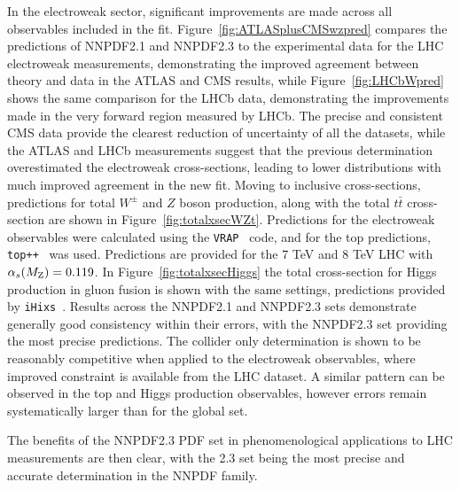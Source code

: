 In the electroweak sector, significant improvements are made across all observables included in the fit. Figure~\ref{fig:ATLASplusCMSwzpred} compares the predictions of NNPDF2.1 and NNPDF2.3 to the experimental data for the LHC electroweak measurements, demonstrating the improved agreement between theory and data in the ATLAS and CMS results, while Figure~\ref{fig:LHCbWpred} shows the same comparison for the LHCb data, demonstrating the improvements made in the very forward region measured by LHCb. The precise and consistent CMS data provide the clearest reduction of uncertainty of all the datasets, while the ATLAS and LHCb measurements suggest that the previous determination overestimated the electroweak cross-sections, leading to lower distributions with much improved agreement in the new fit.
\clearpage
Moving to inclusive cross-sections, predictions for total $W^\pm$ and $Z$ boson production, along with the total $t\bar{t}$ cross-section are shown in Figure~\ref{fig:totalxsecWZt}. Predictions for the electroweak observables were calculated using the {\tt VRAP}~\cite{Anastasiou:2003ds} code, and for the top predictions, {\tt top++}~\cite{Czakon:2011xx,Baernreuther:2012ws} was used. Predictions are provided for the $7$ TeV and $8$ TeV LHC with $\alpha_s(M_{\rm Z})=0.119$. In Figure~\ref{fig:totalxsecHiggs} the total cross-section for Higgs production in gluon fusion is shown with the same settings, predictions provided by {\tt iHixs}~\cite{Anastasiou:2011pi}. Results across the NNPDF2.1 and NNPDF2.3 sets demonstrate generally good consistency within their errors, with the NNPDF2.3 set providing the most precise predictions. The collider only determination is shown to be reasonably competitive when applied to the electroweak observables, where improved constraint is available from the LHC dataset. A similar pattern can be observed in the top and Higgs production observables, however errors remain systematically larger than for the global set.

The benefits of the NNPDF2.3 PDF set in phenomenological applications to LHC measurements are then clear, with the 2.3 set being the most precise and accurate determination in the NNPDF family.

\clearpage

